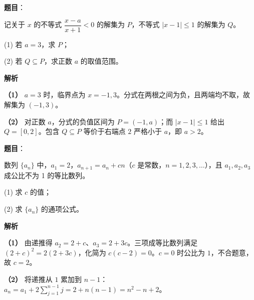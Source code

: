 \begin{answer}

\textbf{题目}：

记关于 $x$ 的不等式 $\dfrac{x-a}{x+1}<0$ 的解集为 $P$，不等式 $|x-1|\leq 1$ 的解集为 $Q$。

(1) 若 $a=3$，求 $P$；

(2) 若 $Q\subseteq P$，求正数 $a$ 的取值范围。

\textbf{解析}

\textbf{（1）} $a=3$ 时，临界点为 $x=-1,3$。分式在两根之间为负，且两端均不取，故解集为 $(-1,3)$。

\textbf{（2）} 对正数 $a$，分式的负值区间为 $P=(-1,a)$；而 $|x-1|\leq1$ 给出 $Q=[0,2]$。包含 $Q\subseteq P$ 等价于右端点 $2$ 严格小于 $a$，即 $a>2$。



\end{answer}
\begin{answer}

\textbf{题目}：

数列 $\{a_n\}$ 中，$a_1=2$，$a_{n+1}=a_n+cn$（$c$ 是常数，$n=1,2,3,\ldots$），且 $a_1,a_2,a_3$ 成公比不为 1 的等比数列。

(1) 求 $c$ 的值；

(2) 求 $\{a_n\}$ 的通项公式。

\textbf{解析}

\textbf{（1）} 由递推得 $a_2=2+c$、$a_3=2+3c$。三项成等比数列满足 $(2+c)^2=2(2+3c)$，化简为 $c(c-2)=0$。$c=0$ 时公比为 $1$，不合题意，故 $c=2$。

\textbf{（2）} 将递推从 $1$ 累加到 $n-1$：$a_n=a_1+2\sum_{j=1}^{n-1}j=2+n(n-1)=n^2-n+2$。



\end{answer}
